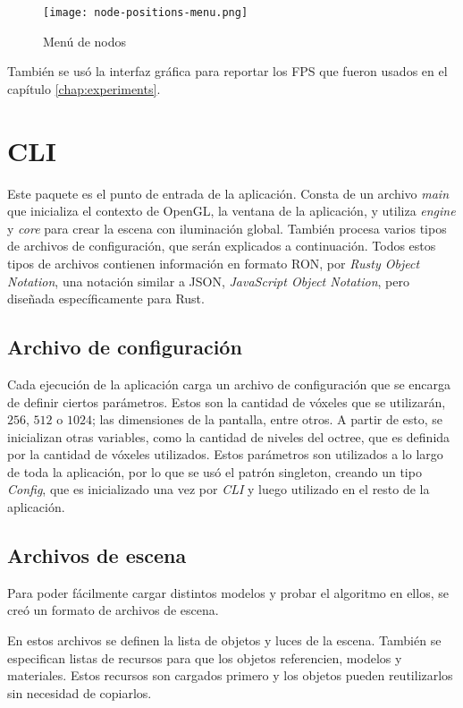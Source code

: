 \begin{figure}
    \centering
    \texttt{[image: node-positions-menu.png]}
    \caption{Menú de nodos}
    \label{fig:node-positions-menu}
\end{figure}

También se usó la interfaz gráfica para reportar los FPS que fueron usados en el capítulo \ref{chap:experiments}.

\section{CLI}

Este paquete es el punto de entrada de la aplicación.
Consta de un archivo \textit{main} que inicializa el contexto de OpenGL, la ventana de la aplicación, y utiliza \textit{engine} y \textit{core} para crear la escena con iluminación global.
También procesa varios tipos de archivos de configuración, que serán explicados a continuación.
Todos estos tipos de archivos contienen información en formato RON, por \textit{Rusty Object Notation}, una notación similar a JSON, \textit{JavaScript Object Notation}, pero diseñada específicamente para Rust.

\subsection{Archivo de configuración}

Cada ejecución de la aplicación carga un archivo de configuración que se encarga de definir ciertos parámetros.
Estos son la cantidad de vóxeles que se utilizarán, $256$, $512$ o $1024$; las dimensiones de la pantalla, entre otros.
A partir de esto, se inicializan otras variables, como la cantidad de niveles del octree, que es definida por la cantidad de vóxeles utilizados.
Estos parámetros son utilizados a lo largo de toda la aplicación, por lo que se usó el patrón singleton, creando un tipo \textit{Config}, que es inicializado una vez por \textit{CLI} y luego utilizado en el resto de la aplicación.

\subsection{Archivos de escena}

Para poder fácilmente cargar distintos modelos y probar el algoritmo en ellos, se creó un formato de archivos de escena.

En estos archivos se definen la lista de objetos y luces de la escena.
También se especifican listas de recursos para que los objetos referencien, modelos y materiales.
Estos recursos son cargados primero y los objetos pueden reutilizarlos sin necesidad de copiarlos.


